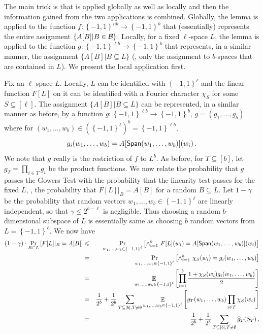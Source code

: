 \documentclass{toc}
\newcommand\set[1]{{\left\{ #1 \right\}}}
\newcommand\Prob[2]{{\Pr_{#1}\left[ {#2} \right]}}
\newcommand\Expect[2]{{\mathop{\mathbb{E}}_{#1}\left[ {#2} \right]}}
\newcommand\cube[1]{ { \set{-1,1}^{#1} } }
\renewcommand\leq{\leqslant}
\begin{document}
The main trick is that  is applied globally as well
as locally and then the information gained from the
two applications is combined.
Globally, the lemma is applied to the
function $f: \cube{nb} \to \cube{b}$ that (essentially) represents the entire assignment $\{A[B] | B \in {\cal B}\}$. Locally, for
a fixed $\ell$-space $L$,
the lemma is applied to the function $g: \cube{\ell b} \to \cube{b}$
that represents, in a similar manner, the assignment  $\{A[B] | B \subseteq L\}$ (\ie, only the assignment to $b$-spaces
that are contained in $L$). We present the local application first.

Fix an $\ell$-space $L$. Locally, $L$ can be identified with $\cube{\ell}$ and the linear function $F[L]$ on it can be
identified with a Fourier character $\chi_S$ for some $S \subseteq [\ell]$. The assignment  $\{A[B] | B \subseteq L\}$
can be represented, in a similar manner as before, by a function $g: \cube{\ell b} \to \cube{b}$, $g = (g_1,\ldots,g_b)$
where for $(w_1, \ldots, w_b) \in (\cube{\ell})^b = \cube{\ell b}$,
 $$ g_i (w_1, \ldots, w_b)  =  A[{\sf Span} (w_1, \ldots, w_b)  ] (w_i)\,.  $$%
We note that $g$ really is the restriction of $f$ to $L^b$.
As before, for $T \subseteq [b]$, let $g_T = \prod_{i\in T} g_i$ be the product functions.
We now relate the probability that $g$ passes the Gowers Test with the probability that the linearity test passes for
the fixed $L$, \ie, the probability that $F[L]|_B = A[B]$  for a random $B \subseteq L$. Let $1-\gamma$ be the probability
that random vectors $w_1, \ldots, w_b \in \cube{\ell}$ are linearly independent, so that $\gamma \leq 2^{b-\ell}$ is
negligible. Thus choosing a random $b$-dimensional subspace of $L$ is essentially same as choosing $b$ random vectors from $L = \cube{\ell}$.
We now have
\begin{eqnarray*}
(1-\gamma) \cdot \Prob{B \subseteq L}{F[L]|_B = A[B]} & \leq &
    \Prob{w_1,\ldots, w_b \in \cube{\ell}}{ \wedge_{i=1}^b   ~F[L](w_i) = A[{\sf Span}(w_1,\ldots, w_b)](w_i) } \\
    & = &   \Prob{w_1,\ldots, w_b \in \cube{\ell}}{ \wedge_{i=1}^b   ~\chi_S(w_i) = g_i(w_1,\ldots, w_b) }\\
    & = &  \Expect{w_1,\ldots, w_b \in \cube{\ell}} {\prod_{i=1}^b \frac{1+\chi_S(w_i) g_i(w_1,\ldots, w_b) }{2} } \\
    & = &  \frac{1}{2^b} + \frac{1}{2^b} \sum_{T \subseteq [b], T \neq  \emptyset } \Expect{w_1,\ldots, w_b \in \cube{\ell}}{ g_T (w_1,\ldots, w_b) \prod_{i \in T}\chi_S(w_i)  }\\
     & = &  \frac{1}{2^b} + \frac{1}{2^b} \sum_{T \subseteq [b], T \neq  \emptyset }  \widehat{g}_T (S_T)\,,%
\end{eqnarray*}
\end{document}
